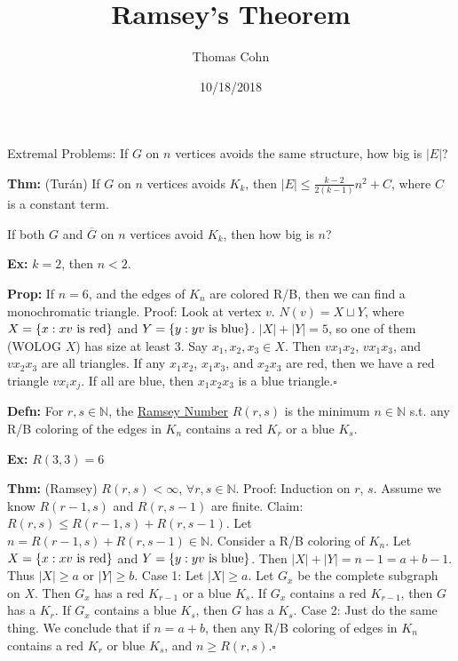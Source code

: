 \documentclass[10pt,letterpaper]{article}
\author{Thomas Cohn}
\title{Ramsey's Theorem}
\date{10/18/2018} %
\newcommand{\n}{\hfill\break}
\newcommand{\defn}[1]{\par\noindent\settowidth{\hangindent}{\textbf{Defn: }}\textbf{Defn: }#1\n}
\newcommand{\thm}[1]{\par\noindent\settowidth{\hangindent}{\textbf{Thm: }}\textbf{Thm: }#1\n}
\newcommand{\prop}[1]{\par\noindent\settowidth{\hangindent}{\textbf{Prop: }}\textbf{Prop: }#1\n}
\newcommand{\ex}[1]{\par\noindent\settowidth{\hangindent}{\textbf{Ex: }}\textbf{Ex: }#1\n}
\newcommand{\proven}{\;$\square$\n}
\newcommand{\ptxt}[1]{\textrm{\textnormal{#1}}}
\newcommand{\card}[1]{\left|#1\right|}
\newcommand{\set}[1]{\left\{#1\right\}}
\newcommand{\naturals}{\mathbb{N}}
\newcommand{\N}{\naturals}
\newcommand{\st}{s.t.}
\begin{document}
\maketitle
\setlength\RaggedRightParindent{\parindent}
\RaggedRight

\par\noindent Extremal Problems: If $G$ on $n$ vertices avoids the same structure, how big is $\card{E}$?\n

\thm{(Tur\'an) If $G$ on $n$ vertices avoids $K_{k}$, then $\card{E}\le\frac{k-2}{2(k-1)}n^{2}+C$, where $C$ is a constant term.}

\par\noindent If both $G$ and $\overline{G}$ on $n$ vertices avoid $K_{k}$, then how big is $n$?\n

\ex{$k=2$, then $n<2$.}

\prop{If $n=6$, and the edges of $K_{n}$ are colored R/B, then we can find a monochromatic triangle.\n
Proof: Look at vertex $v$. $N(v)=X\sqcup{}Y$, where $X=\set{x:xv\ptxt{ is red}}$ and $Y=\set{y:yv\ptxt{ is blue}}$.\n
$\card{X}+\card{Y}=5$, so one of them (WOLOG $X$) has size at least $3$.\n
\n
Say $x_{1},x_{2},x_{3}\in{}X$. Then $vx_{1}x_{2}$, $vx_{1}x_{3}$, and $vx_{2}x_{3}$ are all triangles. If any $x_{1}x_{2}$, $x_{1}x_{3}$, and $x_{2}x_{3}$ are red, then we have a red triangle $vx_{i}x_{j}$. If all are blue, then $x_{1}x_{2}x_{3}$ is a blue triangle.\proven}

\defn{For $r,s\in\N$, the \underline{Ramsey Number} $R(r,s)$ is the minimum $n\in\N$ \st{} any R/B coloring of the edges in $K_{n}$ contains a red $K_{r}$ or a blue $K_{s}$.}

\ex{$R(3,3)=6$}

\thm{(Ramsey) $R(r,s)<\infty$, $\forall{}r,s\in\N$.\n
Proof: Induction on $r$, $s$.\n
Assume we know $R(r-1,s)$ and $R(r,s-1)$ are finite.\n
Claim: $R(r,s)\le{}R(r-1,s)+R(r,s-1)$. Let $n=R(r-1,s)+R(r,s-1)\in\N$. Consider a R/B coloring of $K_{n}$. Let $X=\set{x:xv\ptxt{ is red}}$ and $Y=\set{y:yv\ptxt{ is blue}}$. Then $\card{X}+\card{Y}=n-1=a+b-1$. Thus $\card{X}\ge{}a$ or $\card{Y}\ge{}b$.\n
\n
Case 1: Let $\card{X}\ge{}a$. Let $G_{x}$ be the complete subgraph on $X$. Then $G_{x}$ has a red $K_{r-1}$ or a blue $K_{s}$. If $G_{x}$ contains a red $K_{r-1}$, then $G$ has a $K_{r}$. If $G_{x}$ contains a blue $K_{s}$, then $G$ has a $K_{s}$.\n
\n
Case 2: Just do the same thing.\n
\n
We conclude that if $n=a+b$, then any R/B coloring of edges in $K_{n}$ contains a red $K_{r}$ or blue $K_{s}$, and $n\ge{}R(r,s)$.\proven}
\end{document}
